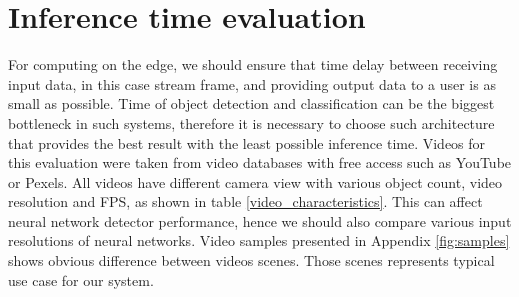 \documentclass[twoside]{ctuthesis}
\theoremstyle{plain}
\theoremstyle{definition}
\theoremstyle{note}
\begin{document}
\section{Inference time evaluation}
For computing on the edge, we should ensure that time delay between receiving input data, in this case stream frame,  and providing output data to a user is as small as possible. Time of object detection and classification can be the biggest bottleneck in such systems, therefore it is necessary to choose such architecture that provides the best result with the least possible inference time. 
Videos for this evaluation were taken from video databases with free access such as YouTube or Pexels. All videos have different camera view with various object count, video resolution and FPS, as shown in table \ref{video_characteristics}. This can affect neural network detector performance, hence we should also compare various input resolutions of neural networks. Video samples presented in Appendix \ref{fig:samples} shows obvious difference between videos scenes. Those scenes represents typical use case for our system.
\end{document}
